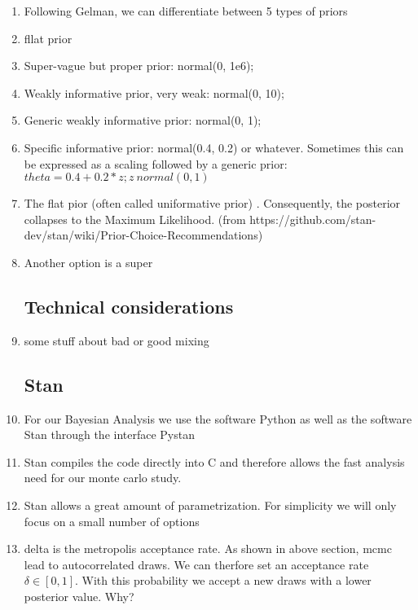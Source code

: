 \begin{enumerate}
\item Following Gelman, we can differentiate between 5 types of priors
 
\item fllat prior
\item Super-vague but proper prior: normal(0, 1e6);
\item Weakly informative prior, very weak: normal(0, 10);
\item Generic weakly informative prior: normal(0, 1);
\item Specific informative prior: normal(0.4, 0.2) or whatever. Sometimes this can be expressed as a scaling followed by a generic prior: $theta = 0.4 + 0.2*z; z ~ normal(0, 1)$

\item The flat pior (often called uniformative prior) . Consequently, the posterior collapses to the Maximum Likelihood. 
(from https://github.com/stan-dev/stan/wiki/Prior-Choice-Recommendations)
\item Another option is a super




\subsection{Technical considerations}

\item some stuff about bad or good mixing



\subsection{Stan}

\item For our Bayesian Analysis we use the software Python as well as the software Stan through the interface Pystan
\item Stan compiles the code directly into C and therefore allows the fast analysis need for our monte carlo study.

\item Stan allows a great amount of  parametrization. For simplicity we will only focus on a small number of options
\item delta is the metropolis acceptance rate. As shown in above section, mcmc lead to autocorrelated draws. 
We can therfore set an acceptance rate $\delta \in[0,1]$. With this probability we accept a new draws with a lower posterior value. Why?


\end{enumerate}
